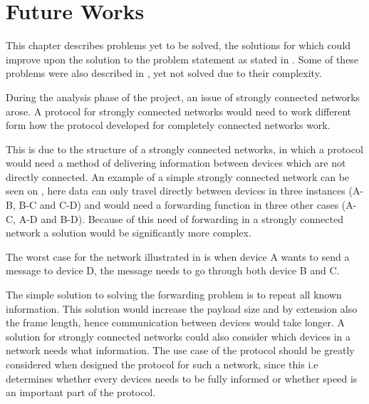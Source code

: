 \chapter{Future Works}\label{futureWorks}
This chapter describes problems yet to be solved, the solutions for which could improve upon the solution to the problem statement as stated in . 
Some of these problems were also described in , yet not solved due to their complexity.

During the analysis phase of the project, an issue of strongly connected networks arose.
A protocol for strongly connected networks would need to work different form how the protocol developed for completely connected networks work.

This is due to the structure of a strongly connected networks, in which a protocol would need a method of delivering information between devices which are not directly connected.
An example of a simple strongly connected network can be seen on , here data can only travel directly between devices in three instances  (A-B, B-C and C-D) and would need a forwarding function in three other cases (A-C, A-D and B-D). 
Because of this need of forwarding in a strongly connected network a solution would be significantly more complex.

\noindent
The worst case for the network illustrated in  is when device A wants to send a message to device D, the message needs to go through both device B and C.

The simple solution to solving the forwarding problem is to repeat all known information.
This solution would increase the payload size and by extension also the frame length, hence communication between devices would take longer.
A solution for strongly connected networks could also consider which devices in a network needs what information.
The use case of the protocol should be greatly considered when designed the protocol for such a network, since this i.e determines whether every devices needs to be fully informed or whether speed is an important part of the protocol.

